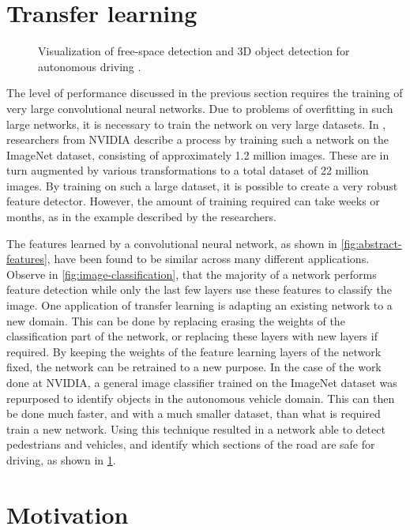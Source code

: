 \documentclass[\rootfolder/main.tex]{subfiles}
\begin{document}
\section{Transfer learning}

\begin{figure}
    \caption{Visualization of free-space detection and 3D object detection for autonomous driving \cite{NVIDIA}.\label{fig:nvidia-cnn}}
\end{figure}

The level of performance discussed in the previous section requires the training of very large convolutional neural networks.
Due to problems of overfitting in such large networks, it is necessary to train the network on very large datasets.
In \cite{NVIDIA}, researchers from NVIDIA describe a process by training such a network on the ImageNet dataset, consisting of approximately 1.2 million images.
These are in turn augmented by various transformations to a total dataset of 22 million images.
By training on such a large dataset, it is possible to create a very robust feature detector.
However, the amount of training required can take weeks or months, as in the example described by the researchers.

The features learned by a convolutional neural network, as shown in \cref{fig:abstract-features}, have been found to be similar across many different applications.
Observe in \cref{fig:image-classification}, that the majority of a network performs feature detection while only the last few layers use these features to classify the image.
One application of transfer learning is adapting an existing network to a new domain.
This can be done by replacing erasing the weights of the classification part of the network, or replacing these layers with new layers if required.
By keeping the weights of the feature learning layers of the network fixed, the network can be retrained to a new purpose.
In the case of the work done at NVIDIA, a general image classifier trained on the ImageNet dataset was repurposed to identify objects in the autonomous vehicle domain.
This can then be done much faster, and with a much smaller dataset, than what is required train a new network.
Using this technique resulted in a network able to detect pedestrians and vehicles, and identify which sections of the road are safe for driving, as shown in \cref{fig:nvidia-cnn}.

\section{Motivation}
\end{document}
